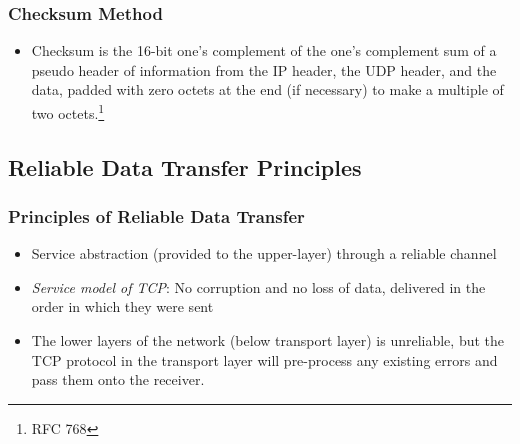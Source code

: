 \subsubsection{Checksum Method}
\begin{itemize}
	\item Checksum is the 16-bit one's complement of the one's complement sum of a pseudo header of information from the IP header, the UDP header, and the data, padded with zero octets at the end (if necessary) to make a multiple of two octets.\footnote{RFC 768}
\end{itemize}

\subsection{Reliable Data Transfer Principles}
\subsubsection{Principles of Reliable Data Transfer}
\begin{itemize}
	\item Service abstraction (provided to the upper-layer) through a reliable channel
	\item \textit{Service model of TCP}: No corruption and no loss of data, delivered in the order in which they were sent
	\item The lower layers of the network (below transport layer) is unreliable, but the TCP protocol in the transport layer will pre-process any existing errors and pass them onto the receiver.
\end{itemize}

